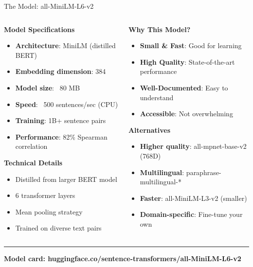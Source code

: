 \documentclass[8pt,aspectratio=169]{beamer}
\newcommand{\bottomnote}[1]{%
\vfill
\vspace{-2mm}
\textcolor{mllavender2}{\rule{\textwidth}{0.4pt}}
\vspace{1mm}
\footnotesize
\textbf{#1}
}
\begin{document}
\begin{frame}[t]{The Model: all-MiniLM-L6-v2}

\begin{columns}[t]
\begin{column}{0.48\textwidth}
\textbf{Model Specifications}

\begin{itemize}
    \item \textbf{Architecture}: MiniLM (distilled BERT)
    \item \textbf{Embedding dimension}: 384
    \item \textbf{Model size}: ~80 MB
    \item \textbf{Speed}: ~500 sentences/sec (CPU)
    \item \textbf{Training}: 1B+ sentence pairs
    \item \textbf{Performance}: 82\% Spearman correlation
\end{itemize}

\vspace{0.5cm}

\textbf{Technical Details}
\begin{itemize}
    \item Distilled from larger BERT model
    \item 6 transformer layers
    \item Mean pooling strategy
    \item Trained on diverse text pairs
\end{itemize}
\end{column}

\begin{column}{0.48\textwidth}
\textbf{Why This Model?}

\begin{itemize}
    \item \textbf{Small \& Fast}: Good for learning
    \item \textbf{High Quality}: State-of-the-art performance
    \item \textbf{Well-Documented}: Easy to understand
    \item \textbf{Accessible}: Not overwhelming
\end{itemize}

\vspace{0.5cm}

\textbf{Alternatives}

\begin{itemize}
    \item \textbf{Higher quality}: all-mpnet-base-v2 (768D)
    \item \textbf{Multilingual}: paraphrase-multilingual-*
    \item \textbf{Faster}: all-MiniLM-L3-v2 (smaller)
    \item \textbf{Domain-specific}: Fine-tune your own
\end{itemize}
\end{column}
\end{columns}

\bottomnote{Model card: huggingface.co/sentence-transformers/all-MiniLM-L6-v2}
\end{frame}
\end{document}
